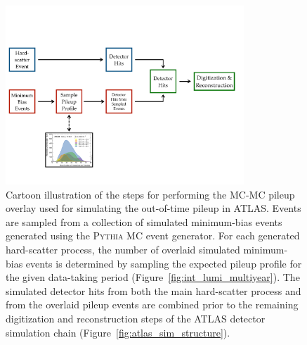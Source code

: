 \begin{figure}[!htb]
    \begin{center}
        \includegraphics[width=0.8\textwidth]{figures/event_simulation/pileup_illustrationPDF}
        \caption{
            Cartoon illustration of the steps for performing the MC-MC pileup overlay used
            for simulating the out-of-time pileup in ATLAS.
            Events are sampled from a collection of simulated minimum-bias events generated using the
            \textsc{Pythia} MC event generator.
            For each generated hard-scatter process, the number of overlaid simulated minimum-bias events is
            determined by sampling the expected pileup profile for the given data-taking period (Figure~\ref{fig:int_lumi_multiyear}).
            The simulated detector hits from both the main hard-scatter process and from
            the overlaid pileup events are combined prior to the remaining digitization and reconstruction
            steps of the ATLAS detector simulation chain (Figure~\ref{fig:atlas_sim_structure}).
        }
        \label{fig:pileup_gen}
    \end{center}
\end{figure}

\FloatBarrier

